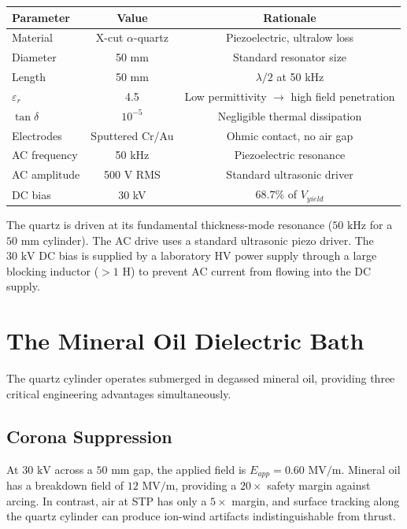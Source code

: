 \begin{center}
\begin{tabular}{|l|c|c|}
\hline
Parameter & Value & Rationale \\ \hline
Material & X-cut $\alpha$-quartz & Piezoelectric, ultralow loss \\
Diameter & 50 mm & Standard resonator size \\
Length & 50 mm & $\lambda/2$ at 50 kHz \\
$\varepsilon_r$ & 4.5 & Low permittivity $\to$ high field penetration \\
$\tan\delta$ & $10^{-5}$ & Negligible thermal dissipation \\
Electrodes & Sputtered Cr/Au & Ohmic contact, no air gap \\
AC frequency & 50 kHz & Piezoelectric resonance \\
AC amplitude & 500 V RMS & Standard ultrasonic driver \\
DC bias & 30 kV & $68.7\%$ of $V_{yield}$ \\
\hline
\end{tabular}
\end{center}

The quartz is driven at its fundamental thickness-mode resonance ($50\text{ kHz}$ for a $50\text{ mm}$ cylinder). The AC drive uses a standard ultrasonic piezo driver. The $30\text{ kV}$ DC bias is supplied by a laboratory HV power supply through a large blocking inductor ($> 1\text{ H}$) to prevent AC current from flowing into the DC supply.

\section{The Mineral Oil Dielectric Bath}

The quartz cylinder operates submerged in degassed mineral oil, providing three critical engineering advantages simultaneously.

\subsection{Corona Suppression}

At $30\text{ kV}$ across a $50\text{ mm}$ gap, the applied field is $E_{app} = 0.60\text{ MV/m}$. Mineral oil has a breakdown field of $12\text{ MV/m}$, providing a $20\times$ safety margin against arcing. In contrast, air at STP has only a $5\times$ margin, and surface tracking along the quartz cylinder can produce ion-wind artifacts indistinguishable from thrust.

